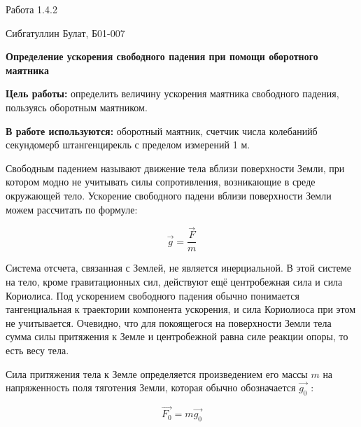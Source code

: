 \documentclass[12pt,a4paper]{article}
\begin{document}
\begin{center}
    \large
    Работа 1.4.2
    
    Сибгатуллин Булат, Б01-007
    
    \vspace{0.5cm}
    \textbf{Определение ускорения свободного падения при помощи оборотного маятника}

\end{center}

\vspace{0.5cm}
\textbf{Цель работы:} определить величину ускорения маятника свободного падения, пользуясь оборотным маятником.
    
\vspace{0.5cm}
\textbf{В работе используются:} оборотный маятник, счетчик числа колебанийб секундомерб штангенцирекль с пределом измерений 1 $\textit{м}$.

\vspace{0.5cm}

Свободным падением называют движение тела вблизи поверхности Земли, при котором модно не учитывать силы сопротивления, возникающие в среде окружающей тело. Ускорение свободного падени вблизи поверхности Земли можем рассчитать по формуле:

\begin{equation}\label{1}
    \Vec{g} = \frac{\Vec{F}}{m}
\end{equation}

Система отсчета, связанная с Землей, не является инерциальной. В этой системе на тело, кроме гравитационных сил, действуют ещё центробежная сила и сила Кориолиса. Под ускорением свободного падения обычно понимается тангенциальная к траектории компонента ускорения, и сила Кориолиоса при этом не учитывается. Очевидно, что для покоящегося на поверхности Земли тела сумма силы притяжения к Земле и центробежной равна силе реакции опоры, то есть весу тела.

Сила притяжения тела к Земле определяется произведением его массы 
\begin{math}
    m
\end{math}
на напряженность поля тяготения Земли, которая обычно обозначается 
\begin{math}
    \Vec{g_0}
\end{math}
:

\begin{equation}\label{2}
    \Vec{F_0} = m\Vec{g_0}
\end{equation}
\end{document}
